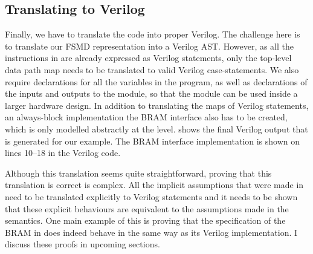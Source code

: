 \subsection{Translating \htl{} to Verilog}

Finally, we have to translate the \htl{} code into proper
Verilog. %
The challenge here is to translate our FSMD representation into a Verilog AST.
However, as all the instructions in \htl{} are already expressed as Verilog
statements, only the top-level data path map needs to be translated to valid
Verilog case-statements.  We also require declarations for all the variables in
the program, as well as declarations of the inputs and outputs to the module, so
that the module can be used inside a larger hardware design.  In addition to
translating the maps of Verilog statements, an always-block implementation the
\gls{BRAM} interface also has to be created, which is only modelled abstractly
at the \htl{} level.   shows the final Verilog output
that is generated for our example.  The \gls{BRAM} interface implementation is
shown on lines 10--18 in the Verilog code.

Although this translation seems quite straight\-forward, proving that this
translation is correct is complex.  All the implicit assumptions that were made
in \htl{} need to be translated explicitly to Verilog statements and it needs to
be shown that these explicit behaviours are equivalent to the assumptions made
in the \htl{} semantics.  One main example of this is proving that the
specification of the \gls{BRAM} in \htl{} does indeed behave in the same way as
its Verilog implementation.  I discuss these proofs in upcoming sections.



